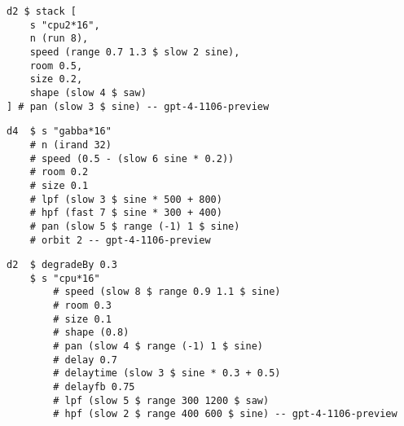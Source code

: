 \begin{minipage}[t]{1\textwidth}
    \centering
    \begin{lstlisting}[style=SuperCollider-IDE, language=ExtendedHaskell, basicstyle=\footnotesize\ttfamily, numbers=none]
d2 $ stack [
    s "cpu2*16",
    n (run 8),
    speed (range 0.7 1.3 $ slow 2 sine),
    room 0.5,
    size 0.2,
    shape (slow 4 $ saw)
] # pan (slow 3 $ sine) -- gpt-4-1106-preview             
    \end{lstlisting}
    \vspace{1cm}
\end{minipage}




\begin{minipage}[t]{1\textwidth}
    \centering
    \begin{lstlisting}[style=SuperCollider-IDE, language=ExtendedHaskell, basicstyle=\footnotesize\ttfamily, numbers=none]
d4  $ s "gabba*16" 
    # n (irand 32) 
    # speed (0.5 - (slow 6 sine * 0.2)) 
    # room 0.2 
    # size 0.1 
    # lpf (slow 3 $ sine * 500 + 800) 
    # hpf (fast 7 $ sine * 300 + 400) 
    # pan (slow 5 $ range (-1) 1 $ sine) 
    # orbit 2 -- gpt-4-1106-preview         
    \end{lstlisting}
    \vspace{1cm}
\end{minipage}




\begin{minipage}[t]{1\textwidth}
    \centering
    \begin{lstlisting}[style=SuperCollider-IDE, language=ExtendedHaskell, basicstyle=\footnotesize\ttfamily, numbers=none]
d2  $ degradeBy 0.3 
    $ s "cpu*16" 
        # speed (slow 8 $ range 0.9 1.1 $ sine) 
        # room 0.3 
        # size 0.1 
        # shape (0.8) 
        # pan (slow 4 $ range (-1) 1 $ sine) 
        # delay 0.7 
        # delaytime (slow 3 $ sine * 0.3 + 0.5) 
        # delayfb 0.75 
        # lpf (slow 5 $ range 300 1200 $ saw) 
        # hpf (slow 2 $ range 400 600 $ sine) -- gpt-4-1106-preview      
    \end{lstlisting}
    \vspace{1cm}
\end{minipage}






